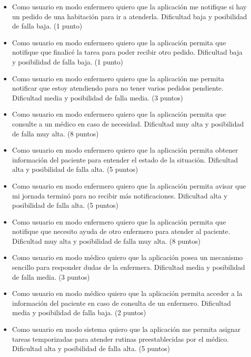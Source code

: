 \documentclass[
11pt, %
]{charter}
\begin{document}
\begin{itemize}
\item Como usuario en modo enfermero quiero que la aplicación me notifique si hay un pedido de una habitación para ir a atenderla. Dificultad baja y posibilidad de falla  baja. (1 punto)

\item Como usuario en modo enfermero quiero que la aplicación permita que notifique que finalicé la tarea para poder recibir otro pedido. Dificultad baja y posibilidad de falla  baja. (1 punto)

\item Como usuario en modo enfermero quiero que la aplicación me permita notificar que estoy atendiendo para no tener varios pedidos pendiente. Dificultad media y posibilidad de falla media. (3 puntos)

\item Como usuario en modo enfermero quiero que la aplicación permita que consulte a un médico en caso de necesidad. Dificultad muy alta y posibilidad de falla muy alta. (8 puntos)

\item Como usuario en modo enfermero quiero que la aplicación permita obtener información del paciente para entender el estado de la situación. Dificultad alta y posibilidad de falla alta. (5 puntos)

\item Como usuario en modo enfermero quiero que la aplicación permita avisar que mi jornada terminó para no recibir más notificaciones. Dificultad alta y posibilidad de falla alta. (5 puntos)

\item Como usuario en modo enfermero quiero que la aplicación permita que notifique que necesito ayuda de otro enfermero para atender al paciente. Dificultad muy alta y posibilidad de falla muy alta. (8 puntos)

\item Como usuario en modo médico quiero que la aplicación posea un mecanismo sencillo para responder dudas de la enfermera. Dificultad media y posibilidad de falla media. (3 puntos)

\item Como usuario en modo médico quiero que la aplicación permita acceder a la información del paciente en caso de consulta de un enfermero. Dificultad media y posibilidad de falla baja. (2 puntos)

\item Como usuario en modo sistema quiero que la aplicación me permita asignar tareas temporizadas para atender rutinas preestablecidas por el médico. Dificultad alta y posibilidad de falla alta. (5 puntos)


\end{itemize}
\end{document}
